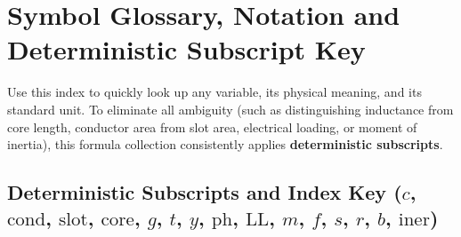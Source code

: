 \section{Symbol Glossary, Notation and Deterministic Subscript Key}

Use this index to quickly look up any variable, its physical meaning, and its standard unit.
To eliminate all ambiguity (such as distinguishing inductance from core length, conductor area from slot area, electrical loading, or moment of inertia), this formula collection consistently applies \textbf{deterministic subscripts}.

\subsection{Deterministic Subscripts and Index Key ($c$, $\mathrm{cond}$, $\mathrm{slot}$, $\mathrm{core}$, $g$, $t$, $y$, $\mathrm{ph}$, $\mathrm{LL}$, $m$, $f$, $s$, $r$, $b$, $\mathrm{iner}$)}
